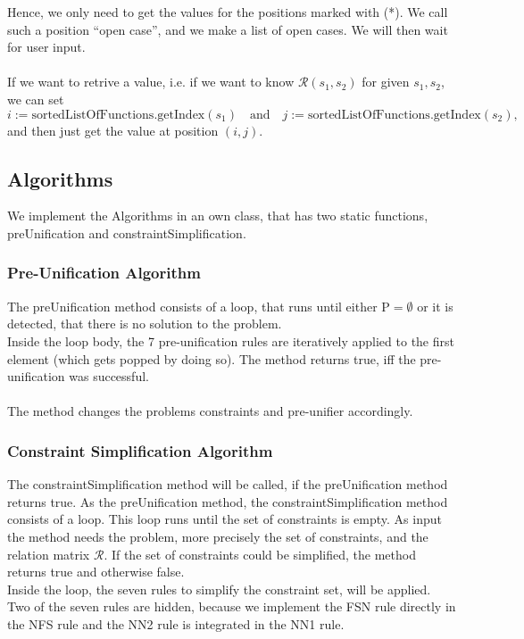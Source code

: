 \documentclass{article}
\begin{document}
Hence, we only need to get the values for the positions marked with (*). We call such a position ``open case'', and we make a list of open cases. We will then wait for user input.\\ \ \\
\noindent
If we want to retrive a value, i.e. if we want to know \(\mathcal{R}(s_1,s_2)\) for given \(s_1,s_2\), we can set 
\[i:= \mathrm{sortedListOfFunctions}.\mathrm{getIndex}(s_1)\quad\text{and}\quad j:= \mathrm{sortedListOfFunctions}.\mathrm{getIndex}(s_2),\]
and then just get the value at position \((i,j)\).
\subsection{Algorithms}

We implement the Algorithms in an own class, that has two static functions, preUnification and constraintSimplification.

\subsubsection{Pre-Unification Algorithm}
The preUnification method consists of a loop, that runs until either \(\mathrm{P}=\emptyset\) or it is detected, that there is no solution to the problem.\\
Inside the loop body, the 7 pre-unification rules are iteratively applied to the first element (which gets popped by doing so). The method returns true, iff the pre-unification was successful.
\\ \ \\
\noindent 
The method changes the problems constraints and pre-unifier accordingly.
	

\subsubsection{Constraint Simplification Algorithm}
The constraintSimplification method will be called, if the preUnification method returns true. As the preUnification method, the constraintSimplification method consists of a loop. This loop runs until the set of constraints is empty. As input the method needs the problem, more precisely the set of constraints, and the relation matrix \(\mathcal{R}\). If the set of constraints could be simplified, the method returns true and otherwise false.\\
Inside the loop, the seven rules to simplify the constraint set, will be applied. Two of the seven rules are hidden, because we implement the FSN rule directly in the NFS rule and the NN2 rule is integrated in the NN1 rule. 
\end{document}
